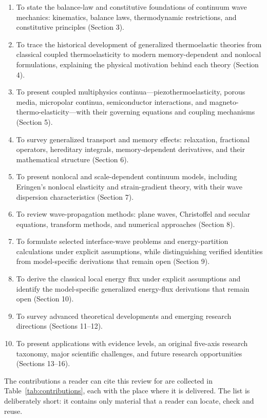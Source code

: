 \begin{enumerate}
\item To state the balance-law and constitutive foundations of continuum wave mechanics: kinematics, balance laws, thermodynamic restrictions, and constitutive principles (Section 3).
\item To trace the historical development of generalized thermoelastic theories from classical coupled thermoelasticity to modern memory-dependent and nonlocal formulations, explaining the physical motivation behind each theory (Section 4).
\item To present coupled multiphysics continua—piezothermoelasticity, porous media, micropolar continua, semiconductor interactions, and magneto-thermo-elasticity—with their governing equations and coupling mechanisms (Section 5).
\item To survey generalized transport and memory effects: relaxation, fractional operators, hereditary integrals, memory-dependent derivatives, and their mathematical structure (Section 6).
\item To present nonlocal and scale-dependent continuum models, including Eringen's nonlocal elasticity and strain-gradient theory, with their wave dispersion characteristics (Section 7).
\item To review wave-propagation methods: plane waves, Christoffel and secular equations, transform methods, and numerical approaches (Section 8).
\item To formulate selected interface-wave problems and energy-partition calculations under explicit assumptions, while distinguishing verified identities from model-specific derivations that remain open (Section 9).
\item To derive the classical local energy flux under explicit assumptions and identify the model-specific generalized energy-flux derivations that remain open (Section 10).
\item To survey advanced theoretical developments and emerging research directions (Sections 11--12).
\item To present applications with evidence levels, an original five-axis research taxonomy, major scientific challenges, and future research opportunities (Sections 13--16).
\end{enumerate}

The contributions a reader can cite this review for are collected in Table~\ref{tab:contributions}, each with the place where it is delivered. The list is deliberately short: it contains only material that a reader can locate, check and reuse.

